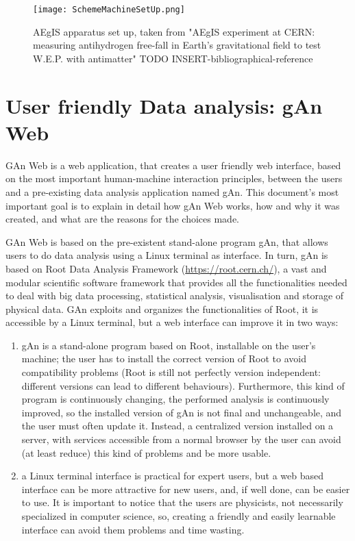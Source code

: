 \begin{figure}[H]
\centering
\texttt{[image: SchemeMachineSetUp.png]} 
\caption{AEgIS apparatus set up, taken from "AEgIS experiment at CERN: measuring antihydrogen free-fall in Earth’s gravitational field to test W.E.P. with antimatter" TODO INSERT-bibliographical-reference}
\end{figure}

\section{User friendly Data analysis: gAn Web}

GAn Web is a web application, that creates a user friendly web interface, based on the most important human-machine interaction principles, between the users and a pre-existing data analysis application named gAn.
This document's most important goal is to explain in detail how gAn Web works, how and why it was created, and what are the reasons for the choices made. 

GAn Web is based on the pre-existent stand-alone program gAn, that allows users to do data analysis using a Linux terminal as interface. In turn, gAn is based on Root Data Analysis Framework (\url{https://root.cern.ch/}), a vast and modular scientific software framework that provides all the functionalities needed to deal with big data processing, statistical analysis, visualisation and storage of physical data. GAn exploits and organizes the functionalities of Root, it is accessible by a Linux terminal, but a web interface can improve it in two ways:

\begin{enumerate}

\item gAn is a stand-alone program based on Root, installable on the user's machine; the user has to install the correct version of Root to avoid compatibility problems (Root is still not perfectly version independent: different versions can lead to different behaviours). Furthermore, this kind of program is continuously changing, the performed analysis is continuously improved, so the installed version of gAn is not final and unchangeable, and the user must often update it. Instead, a centralized version installed on a server, with services accessible from a normal browser by the user can avoid (at least reduce) this kind of problems and be more usable.    
 

\item a Linux terminal interface is practical for expert users, but a web based interface can be more attractive for new users, and, if well done, can be easier to use. It is important to notice that the users are physicists, not necessarily specialized in computer science, so, creating a friendly and easily learnable interface can avoid them problems and time wasting.   


\end{enumerate}


